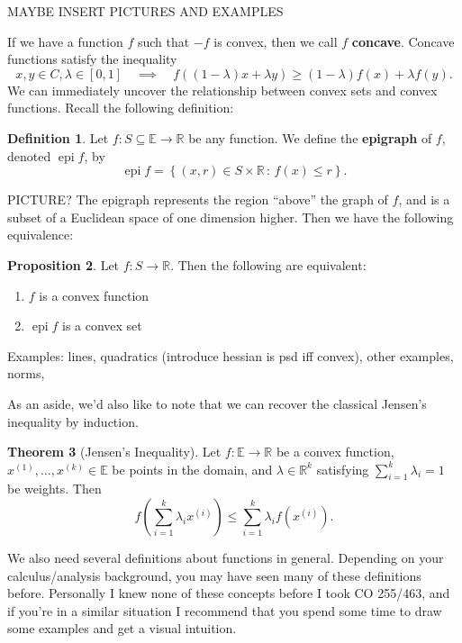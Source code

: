 \documentclass{article}
\numberwithin{equation}{section}
\theoremstyle{definition}
\newtheorem{theorem}{Theorem}[section]
\newtheorem{proposition}[theorem]{Proposition}
\newtheorem{definition}[theorem]{Definition}%
\newcommand{\bE}{\mathbb{E}}
\newcommand{\bR}{\mathbb{R}}
\newcommand{\set}[2]{\left\{#1\,:\,#2\right\}}
\newcommand{\epi}{\operatorname{epi}}
\begin{document}
MAYBE INSERT PICTURES AND EXAMPLES

If we have a function $f$ such that $-f$ is convex, then we call $f$ \textbf{concave}. Concave functions satisfy the inequality
    \begin{equation}
        \label{defccvfneq}
        x, y\in C, \lambda\in[0, 1]\quad\implies\quad f((1-\lambda)x+\lambda y)\ge (1-\lambda)f(x)+\lambda f(y).
    \end{equation}
We can immediately uncover the relationship between convex sets and convex functions. Recall the following definition:
\begin{definition}
    Let $f:S\subseteq\bE\to\bR$ be any function. We define the \textbf{epigraph} of $f$, denoted $\epi f$, by
    \begin{equation}
        \epi f=\set{(x, r)\in S\times\bR}{f(x)\le r}.
    \end{equation}
\end{definition}
PICTURE? The epigraph represents the region ``above'' the graph of $f$, and is a subset of a Euclidean space of one dimension higher. Then we have the following equivalence:
\begin{proposition}
    Let $f:S\to\bR$. Then the following are equivalent:
    \begin{enumerate}[label=(\roman*)]
        \item $f$ is a convex function
        \item $\epi f$ is a convex set
    \end{enumerate}
\end{proposition}
Examples: lines, quadratics (introduce hessian is psd iff convex), other examples, norms,

As an aside, we'd also like to note that we can recover the classical Jensen's inequality by induction.
\begin{theorem}[Jensen's Inequality]
    Let $f:\bE\to\bR$ be a convex function, $x^{(1)},\dots, x^{(k)}\in\bE$ be points in the domain, and $\lambda\in\bR^k$ satisfying $\sum_{i=1}^k\lambda_i=1$ be weights. Then
    \begin{equation}
        f\left(\sum_{i=1}^k\lambda_ix^{(i)}\right)\le\sum_{i=1}^k\lambda_if(x^{(i)}).
    \end{equation}
\end{theorem}
We also need several definitions about functions in general. Depending on your calculus/analysis background, you may have seen many of these definitions before. Personally I knew none of these concepts before I took CO 255/463, and if you're in a similar situation I recommend that you spend some time to draw some examples and get a visual intuition.
\end{document}
